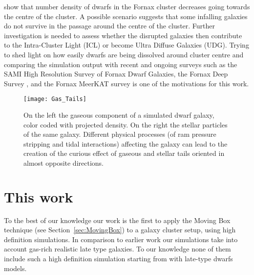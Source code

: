 \citet{Venhola2018} show that number density of dwarfs in the Fornax cluster decreases going towards the centre of the cluster. A possible scenario suggests that some infalling galaxies do not survive in the passage around the centre of the cluster.
Further investigation is needed to assess  whether the disrupted galaxies then contribute to the Intra-Cluster Light (ICL) or become Ultra Diffuse Galaxies (UDG).
Trying to shed light on how easily dwarfs are being dissolved around cluster centre and comparing the simulation output with recent and ongoing surveys such as the SAMI High Resolution Survey of Fornax Dwarf Galaxies, \citep{Owers2019, Scott2018}
the Fornax Deep Survey \citep{Venhola2018}, and the Fornax MeerKAT survey \citep{Loni2021} is one of the motivations for this work.



\begin{figure}
  \centering
  \texttt{[image: Gas\_Tails]}
  \caption{On the left the gaseous component of a simulated dwarf galaxy, color coded with projected density.
    On the right the stellar particles of the same galaxy.
   Different physical processes (of ram pressure stripping and tidal interactions) affecting the galaxy can lead to the creation of the curious effect of gaseous and stellar tails oriented in almost opposite directions.}
  \label{fig:tails}
\end{figure}


\section{This work}
To the best of our knowledge our work is the first to apply the Moving Box technique (see Section~\ref{sec:MovingBox}) to a galaxy cluster setup, using high definition simulations.
In comparison to earlier work our simulations take into account gas-rich realistic late type galaxies. To our knowledge none of them include such a high definition simulation starting from with late-type dwarfs models.
